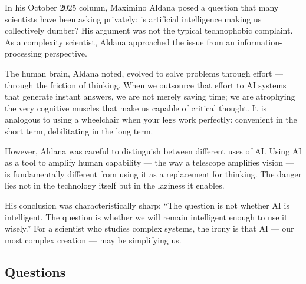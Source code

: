 \documentclass[10pt,a4paper]{article}
\begin{document}
\begin{tcolorbox}[colback=white, colframe=black,
    title={Based on Aldana: ``Is AI Frying Our Brains?'' (Oct 3, 2025)}]
\small
In his October 2025 column, Maximino Aldana posed a question that
many scientists have been asking privately: is artificial intelligence
making us collectively dumber? His argument was not the typical
technophobic complaint. As a complexity scientist, Aldana approached
the issue from an information-processing perspective.

The human brain, Aldana noted, evolved to solve problems through
effort --- through the friction of thinking. When we outsource that
effort to AI systems that generate instant answers, we are not
merely saving time; we are atrophying the very cognitive muscles
that make us capable of critical thought. It is analogous to using
a wheelchair when your legs work perfectly: convenient in the short
term, debilitating in the long term.

However, Aldana was careful to distinguish between different uses
of AI. Using AI as a tool to amplify human capability --- the way a
telescope amplifies vision --- is fundamentally different from using
it as a replacement for thinking. The danger lies not in the
technology itself but in the laziness it enables.

His conclusion was characteristically sharp: ``The question is not
whether AI is intelligent. The question is whether we will remain
intelligent enough to use it wisely.'' For a scientist who studies
complex systems, the irony is that AI --- our most complex creation
--- may be simplifying us.
\end{tcolorbox}

\subsection*{Questions}
\end{document}
